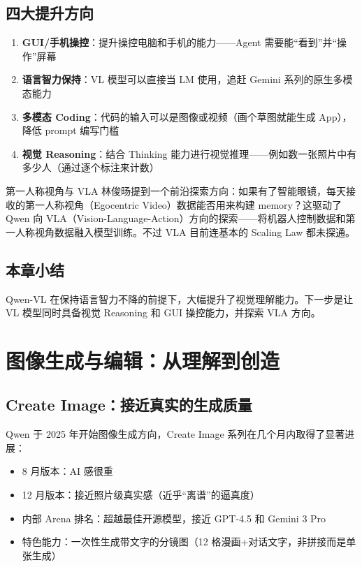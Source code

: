 \documentclass[a4paper]{article}
\begin{document}
\subsection{四大提升方向}

\begin{enumerate}
    \item \textbf{GUI/手机操控}：提升操控电脑和手机的能力——Agent 需要能``看到''并``操作''屏幕
    \item \textbf{语言智力保持}：VL 模型可以直接当 LM 使用，追赶 Gemini 系列的原生多模态能力
    \item \textbf{多模态 Coding}：代码的输入可以是图像或视频（画个草图就能生成 App），降低 prompt 编写门槛
    \item \textbf{视觉 Reasoning}：结合 Thinking 能力进行视觉推理——例如数一张照片中有多少人（通过逐个标注来计数）
\end{enumerate}

\begin{knowledgebox}{第一人称视角与 VLA}
林俊旸提到一个前沿探索方向：如果有了智能眼镜，每天接收的第一人称视角（Egocentric Video）数据能否用来构建 memory？这驱动了 Qwen 向 VLA（Vision-Language-Action）方向的探索——将机器人控制数据和第一人称视角数据融入模型训练。不过 VLA 目前连基本的 Scaling Law 都未探通。
\end{knowledgebox}

\subsection{本章小结}

Qwen-VL 在保持语言智力不降的前提下，大幅提升了视觉理解能力。下一步是让 VL 模型同时具备视觉 Reasoning 和 GUI 操控能力，并探索 VLA 方向。

\section{图像生成与编辑：从理解到创造}

\subsection{Create Image：接近真实的生成质量}

Qwen 于 2025 年开始图像生成方向，Create Image 系列在几个月内取得了显著进展：

\begin{itemize}
    \item 8 月版本：AI 感很重
    \item 12 月版本：接近照片级真实感（近乎``离谱''的逼真度）
    \item 内部 Arena 排名：超越最佳开源模型，接近 GPT-4.5 和 Gemini 3 Pro
    \item 特色能力：一次性生成带文字的分镜图（12 格漫画+对话文字，非拼接而是单张生成）
\end{itemize}
\end{document}

